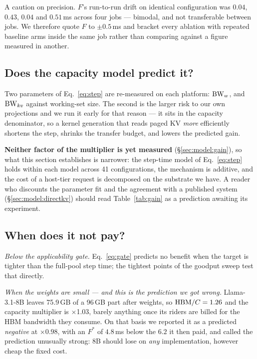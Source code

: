 A caution on precision. $F$'s run-to-run drift on identical configuration was
$0.04$, $0.43$, $0.04$ and $0.51$\,ms across four jobs --- bimodal, and not
transferable between jobs. We therefore quote $F$ to $\pm 0.5$\,ms and bracket
every ablation with repeated baseline arms inside the same job rather than
comparing against a figure measured in another.

\subsection{Does the capacity model predict it?}
\label{sec:eval:model}

Two parameters of Eq.~\ref{eq:step} are re-measured on each platform: $\mathrm{BW}_w$, and
$\mathrm{BW}_{kv}$ against working-set size. The second is the larger risk to our own
projections and we run it early for that reason --- it sits in the capacity
denominator, so a kernel generation that reads paged KV \emph{more} efficiently
shortens the step, shrinks the transfer budget, and lowers the predicted gain.

\textbf{Neither factor of the multiplier is yet measured} (\S\ref{sec:model:gain}),
so what this section establishes is narrower: the step-time model of
Eq.~\ref{eq:step} holds within each model across 41 configurations, the mechanism is
additive, and the cost of a host-tier request is decomposed on the substrate we
have. A reader who discounts the parameter fit and the agreement with a published
system (\S\ref{sec:model:directkv}) should read Table~\ref{tab:gain} as a prediction
awaiting its experiment.

\subsection{When does it not pay?}
\label{sec:eval:negative}

\emph{Below the applicability gate.} Eq.~\ref{eq:gate} predicts no benefit when the
target is tighter than the full-pool step time; the tightest points of the goodput
sweep test that directly.

\emph{When the weights are small --- and this is the prediction we got wrong.}
Llama-3.1-8B leaves 75.9\,GB of a 96\,GB part after weights, so
$\mathrm{HBM}/C = 1.26$ and the capacity multiplier is $\times$1.03, barely anything once
its riders are billed for the HBM bandwidth they consume. On that basis we reported
it as a predicted \emph{negative} at $\times 0.98$, with an $F^{*}$ of $4.8$\,ms
below the $6.2$ it then paid, and called the prediction unusually strong: 8B should
lose on \emph{any} implementation, however cheap the fixed cost.

